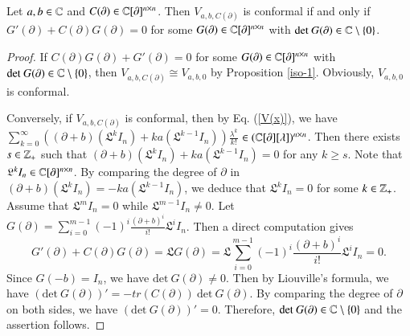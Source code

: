 \documentclass[12pt]{amsart}
\begin{document}
\begin{pro}Let $a,b\in\mathbb{C}$ and $C(\partial)\in\mathbb{C}[\partial]^{n\times n}$.
Then $V_{a,b,C(\partial)}$ is conformal if and only if $G'(\partial)+C(\partial)G(\partial)=0$ for some $G(\partial)\in\mathbb{C}[\partial]^{n\times n}$ with $\text{det}~G(\partial)\in\mathbb{C}\setminus\{0\}$.
\end{pro}
\begin{proof}
If $C(\partial)G(\partial)+G'(\partial)=0$ for some $G(\partial)\in\mathbb{C}[\partial]^{n\times n}$ with $\text{det}~G(\partial)\in\mathbb{C}\setminus\{0\}$, then $V_{a,b,C(\partial)}\cong V_{a,b,0}$ by Proposition \ref{iso-1}. Obviously, $V_{a,b,0}$ is conformal.

Conversely, if $V_{a,b,C(\partial)}$ is conformal, then by Eq. (\ref{V(x)}), we have
$\sum_{k=0}^\infty((\partial+b)(\mathfrak{L}^kI_n)+ka(\mathfrak{L}^{k-1}I_n))\frac{\lambda^k}{k!}$ $
\in(\mathbb{C}[\partial][\lambda])^{n\times n}$. Then there exists $ s\in\mathbb{Z}_+$ such that $(\partial+b)(\mathfrak{L}^kI_n)+ka(\mathfrak{L}^{k-1}I_n)=0$ for any $ k\geq s$.
Note that $\mathfrak{L}^kI_n\in\mathbb{C}[\partial]^{n\times n}$.
By comparing the degree of $\partial$ in $(\partial+b)(\mathfrak{L}^kI_n)=-ka(\mathfrak{L}^{k-1}I_n)$, we deduce that
$\mathfrak{L}^kI_n=0$ for some $k\in\mathbb{Z}_+$. Assume that $\mathfrak{L}^mI_n=0$ while
$\mathfrak{L}^{m-1}I_n\neq0$.
Let $G(\partial)=\sum_{i=0}^{m-1}(-1)^i\frac{(\partial+b)^i}{i!}\mathfrak{L}^iI_n$. Then a direct computation gives
$$G'(\partial)+C(\partial)G(\partial)=\mathfrak{L}G(\partial)=
\mathfrak{L}\sum_{i=0}^{m-1}(-1)^i\frac{(\partial+b)^i}{i!}\mathfrak{L}^iI_n=0.$$
Since $G(-b)=I_n$, we have $\text{det}~G(\partial)\neq 0$. Then by Liouville's formula, we have $(\text{det}~G(\partial))'=-tr(C(\partial))~\text{det}~G(\partial)$. By comparing the degree of $\partial$ on both sides, we have $(\text{det}~G(\partial))'=0$. Therefore, $\text{det}~G(\partial)\in\mathbb{C}\setminus\{0\}$ and the assertion follows.
\end{proof}
\end{document}
